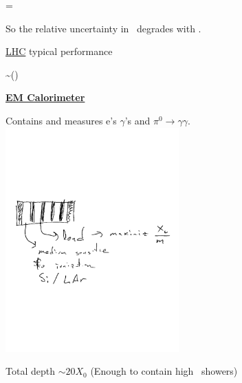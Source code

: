 {\begin{minipage}{0.7\textwidth}
\be
\Rightarrow \Delta {} = 
\ee

So the relative uncertainty in \pt\ degrades with \pt.
\end{minipage}

\underline{LHC} typical performance

\be
\frac{\Delta \pt}{\pt} \sim () 
\ee

\clearpage
\textbf{\underline{EM Calorimeter}}

Contains and measures e's $\gamma$'s and $\pi^0\rightarrow\gamma\gamma$.
\bc
\includegraphics[width=0.5\textwidth]{./EMCalorimeter.pdf}
\ec

Total depth $\sim 20 X_0$ (Enough to contain high \pt\ showers)

}
